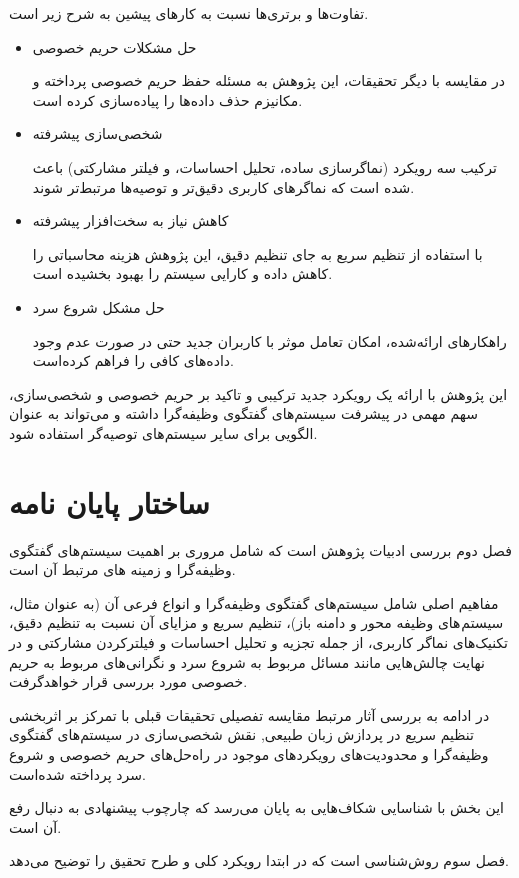 تفاوت‌ها و برتری‌ها نسبت به کارهای پیشین به شرح زیر است.
\begin{itemize}
\item
حل مشکلات حریم خصوصی

در مقایسه با دیگر تحقیقات، این پژوهش به مسئله حفظ حریم خصوصی پرداخته و مکانیزم حذف داده‌ها را پیاده‌سازی کرده است.
\item
شخصی‌سازی پیشرفته

ترکیب سه رویکرد (نماگر‌سازی ساده، تحلیل احساسات، و فیلتر مشارکتی) باعث شده است که نماگر‌های کاربری دقیق‌تر و توصیه‌ها مرتبط‌تر شوند.
\item
کاهش نیاز به سخت‌افزار پیشرفته

با استفاده از تنظیم سریع به جای تنظیم دقیق، این پژوهش هزینه محاسباتی را کاهش داده و کارایی سیستم را بهبود بخشیده است.
\item
حل مشکل شروع سرد

راهکارهای ارائه‌شده، امکان تعامل موثر با کاربران جدید حتی در صورت عدم وجود داده‌های کافی را فراهم کرده‌است.
\end{itemize}

این پژوهش با ارائه یک رویکرد جدید ترکیبی و تاکید بر حریم خصوصی و شخصی‌سازی، سهم مهمی در پیشرفت سیستم‌های گفتگوی وظیفه‌گرا داشته و می‌تواند به عنوان الگویی برای سایر سیستم‌های توصیه‌گر استفاده شود.



\section{ساختار پایان نامه}

فصل دوم بررسی ادبیات پژوهش است که شامل مروری بر اهمیت  سیستم‌های گفتگوی وظیفه‌گرا و زمینه های مرتبط آن است.

مفاهیم اصلی شامل سیستم‌های گفتگوی وظیفه‌گرا و انواع فرعی آن (به عنوان مثال، سیستم های وظیفه محور و دامنه باز)، تنظیم سریع و مزایای آن نسبت به تنظیم دقیق، تکنیک‌های نماگر کاربری، از جمله تجزیه و تحلیل احساسات و فیلتر‌کردن مشارکتی و در نهایت چالش‌هایی مانند مسائل مربوط به شروع سرد و نگرانی‌های مربوط به حریم خصوصی مورد بررسی قرار خواهد‌گرفت.

در ادامه به بررسی آثار مرتبط مقایسه تفصیلی تحقیقات قبلی با تمرکز بر اثربخشی تنظیم سریع در پردازش زبان طبیعی, نقش شخصی‌سازی در  سیستم‌های گفتگوی وظیفه‌گرا و محدودیت‌های رویکردهای موجود در راه‌حل‌های حریم خصوصی و شروع سرد پرداخته شده‌است.

این بخش با شناسایی شکاف‌هایی به پایان می‌رسد که چارچوب پیشنهادی به دنبال رفع آن است.

فصل سوم روش‌شناسی است که در ابتدا رویکرد کلی و طرح تحقیق را توضیح می‌دهد.

